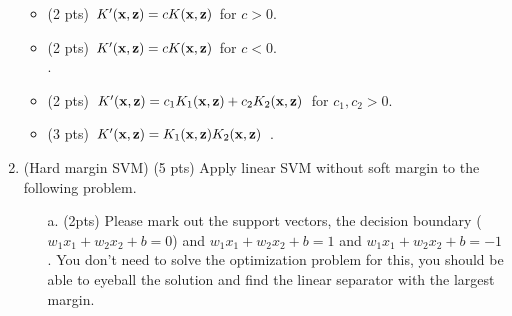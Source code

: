 \documentclass{article}
\def\z{{\bf z}}
\def\x{{\bf x}}
\begin{document}
\begin{enumerate}
\begin{itemize}
\item (2 pts) $K'(\x, \z) = cK(\x, \z)$ for $c > 0$.\\
\item (2 pts) $K'(\x,\z) = cK(\x, \z)$ for $c < 0$.\\
.
\item (2 pts) $K'(\x,\z)= c_1K_1(\x, \z)+c_2K_2(\x,\z)$ for $c_1, c_2 >0$.\\
\item (3 pts) $K'(\x,\z)= K_1(\x, \z)K_2(\x,\z)$ .\\

\end{itemize}

\newpage
\item (Hard margin SVM) (5 pts) Apply linear SVM without soft margin to the 
following problem.

\begin{itemize} \item[a.] (2pts) Please mark out the support vectors, the 
decision boundary ($w_1x_1+w_2x_2 +b =0$) and $w_1x_1+w_2x_2+b =1$ and 
$w_1x_1+w_2x_2+b =-1$. You don't need to solve the optimization problem for 
this, you should be able to eyeball the solution and find the linear separator 
with the largest margin.

\end{itemize}
\end{enumerate}
\end{document}
